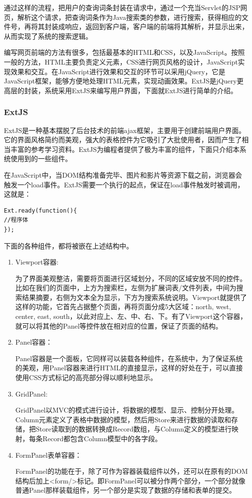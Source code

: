 \documentclass[12pt,a4paper]{article}
\begin{document}
	通过这样的流程，把用户的查询词条封装在请求中，通过一个充当Servlet的JSP网页，解析这个请求，把查询词条作为Java搜索类的参数，进行搜索，获得相应的文件号，再将其封装成响应，返回到客户端，客户端的前端将其解析，并显示出来，从而实现了系统的搜索逻辑。
	
	编写网页前端的方法有很多，包括最基本的HTML和CSS，以及JavaScript。按照一般的方法，HTML主要负责定义元素，CSS进行网页风格的设计，JavaScript实现效果和交互。在JavaScript进行效果和交互的环节可以采用jQuery，它是JavaScript框架，能够方便地处理HTML元素，实现动画效果。ExtJS是jQuery更高层的封装，系统采用ExtJS来编写用户界面，下面就ExtJS进行简单的介绍。
		
		\subsubsection{ExtJS}
	ExtJS是一种基本摆脱了后台技术的前端ajax框架，主要用于创建前端用户界面。它的界面风格简约而美观，强大的表格控件为它吸引了大批使用者，因而产生了相当丰富的参考学习资料。ExtJS为编程者提供了极为丰富的组件，下面只介绍本系统使用到的一些组件。
	
	在JavaScript中，当DOM结构准备完毕、图片和影片等资源下载之前，浏览器会触发一个load事件。ExtJS需要一个执行的起点，保证在load事件触发时被调用，这就是：
\lstset{language=C,frame=lines}
\begin{lstlisting}
Ext.ready(function(){
//程序体
});
\end{lstlisting}	

	下面的各种组件，都将被嵌在上述结构中。
\begin{enumerate}
\item
Viewport容器:

	为了界面美观整洁，需要将页面进行区域划分，不同的区域安放不同的控件。比如在我们的页面中，上方为搜索栏，左侧为扩展词表/文件列表，中间为搜索结果摘要，右侧为文本全为显示，下方为搜索系统说明。Viewport就提供了这样的功能，它首先占据整个页面，再将页面分成5大区域：north, west, center, east, south，以此对应上、左、中、右、下。有了Viewport这个容器，就可以将其他的Panel等控件放在相对应的位置，保证了页面的结构。
	
\item
Panel容器：

	Panel容器是一个面板，它同样可以装载各种组件，在系统中，为了保证系统的美观，用Panel容器来进行HTML的直接显示，这样的好处在于，可以直接使用CSS方式标记的高亮部分得以顺利地显示。
	
\item 
GridPanel:

	GridPanel以MVC的模式进行设计，将数据的模型、显示、控制分开处理。Column元素定义了表格中数据的模型，然后用Store来进行数据的读取和存储，把Store读取到的数据转换成Record数组，与Column定义的模型进行映射，每条Record都包含Column模型中的各字段。

\item
FormPanel表单容器：

	FormPanel的功能在于，除了可作为容器装载组件以外，还可以在原有的DOM结构后加上<form/>标记。即FormPanel可以被分作两个部分，一个部分就像普通Panel那样装载组件，另一个部分是实现了数据的存储和表单的提交。
	
\end{enumerate}
\end{document}
